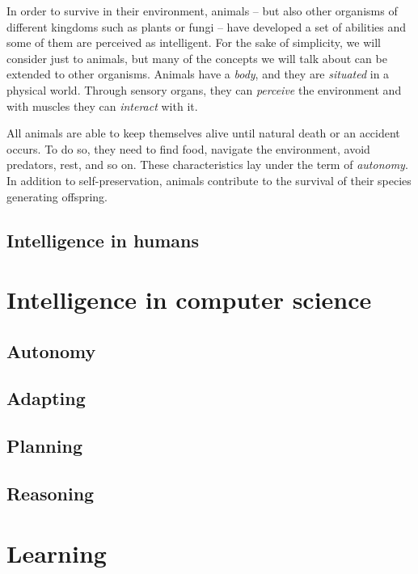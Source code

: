 In order to survive in their environment, animals -- but also other organisms of different kingdoms such as plants or fungi -- have developed a set of abilities and some of them are perceived as intelligent.
%
For the sake of simplicity, we will consider just to animals, but many of the concepts we will talk about can be extended to other organisms.
%
Animals have a \emph{body}, and they are \emph{situated} in a physical world.
%
Through sensory organs, they can \emph{perceive} the environment and with muscles they can \emph{interact} with it.


All animals are able to keep themselves alive until natural death or an accident occurs.
%
To do so, they need to find food, navigate the environment, avoid predators, rest, and so on.
%
These characteristics lay under the term of \emph{autonomy}.
%
In addition to self-preservation, animals contribute to the survival of their species generating offspring.


\subsection{Intelligence in humans}\label{subsec:intelligence-in-humans}


\section{Intelligence in computer science}\label{sec:intelligence-in-computer-science}

\subsection{Autonomy}\label{subsec:autonomy}

\subsection{Adapting}\label{subsec:adapting}

\subsection{Planning}\label{subsec:planning}

\subsection{Reasoning}\label{subsec:reasoning}


\section{Learning}\label{sec:learning}

